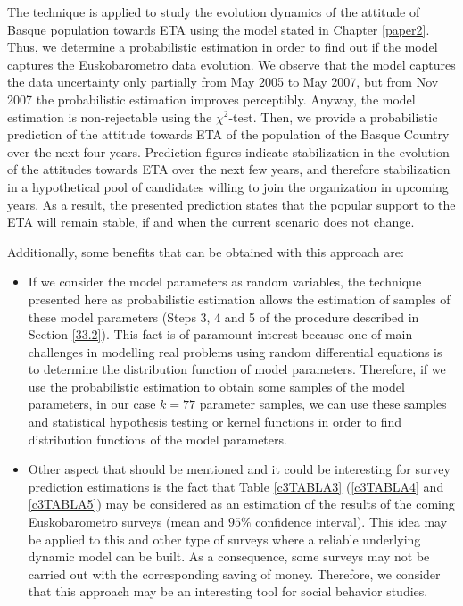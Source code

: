 The technique is applied to study the evolution dynamics of the attitude of Basque population towards ETA using the model stated in Chapter \ref{paper2}. Thus, we determine a probabilistic estimation in order to find out if the model captures the Euskobarometro data evolution. We observe that the model captures the data uncertainty only partially from May 2005 to May 2007, but from Nov 2007 the probabilistic estimation improves perceptibly. Anyway, the model estimation is non-rejectable using the $\chi^2$-test. Then, we provide a probabilistic prediction of the attitude towards ETA of the population of the Basque Country over the next four years. Prediction figures indicate stabilization in the evolution of the attitudes towards ETA over the next few years, and therefore stabilization in a hypothetical pool of candidates willing to join the organization in upcoming years. As a result, the presented prediction states that the popular support to the ETA will remain stable, if and when the current scenario does not change.

Additionally, some benefits that can be obtained with this approach are:

\begin{itemize}
\item If we consider the model parameters as random variables, the technique presented here as probabilistic estimation allows the estimation of samples of these model parameters (Steps 3, 4 and 5 of the procedure described in Section \ref{33.2}). This fact is of paramount interest because one of main challenges in modelling real problems using random differential equations is to determine the distribution function of model parameters. Therefore, if we use the probabilistic estimation to obtain some samples of the model parameters, in our case $k=77$ parameter samples, we can use these samples and statistical hypothesis testing or kernel functions in order to find distribution functions of the model parameters. 
\item Other aspect that should be mentioned and it could be interesting for survey prediction estimations is the fact that Table \ref{c3TABLA3} (\ref{c3TABLA4} and \ref{c3TABLA5}) may be considered as an estimation of the results of the coming Euskobarometro surveys (mean and $95\%$ confidence interval). This idea may be applied to this and other type of surveys where a reliable underlying dynamic model can be built. As a consequence, some surveys may not be carried out with the corresponding saving of money. Therefore, we consider that this approach may be an interesting tool for social behavior studies.
\end{itemize}

